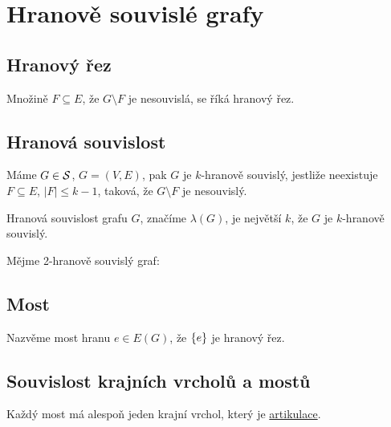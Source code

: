 \section{Hranově souvislé grafy}
\subsection{Hranový řez}
Množině $F \subseteq E$, že $G \setminus F$ je nesouvislá, se říká hranový řez.

\subsection{Hranová souvislost}
Máme $G \in \S$, $G = (V,E)$, pak $G$ je $k$-hranově souvislý, jestliže neexistuje $F \subseteq E$, $|F| \leq k-1$, 
taková, že $G \setminus F$ je nesouvislý.

Hranová souvislost grafu $G$, značíme $\lambda(G)$, je největší $k$, že $G$ je $k$-hranově souvislý.\\

Mějme 2-hranově souvislý graf:
\begin{figure}[H]
    \centering
\end{figure}


\subsection{Most}
Nazvěme most hranu $e\in E(G)$, že $\bc{e}$ je hranový řez.

\subsection{Souvislost krajních vrcholů a mostů} %
Každý most má alespoň jeden krajní vrchol, který je \hyperref[artikulace]{artikulace}.

